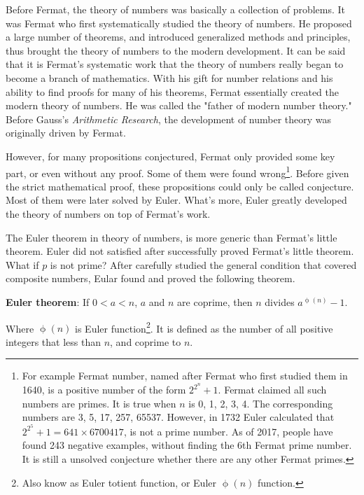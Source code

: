 \documentclass{article}
\begin{document}
Before Fermat, the theory of numbers was basically a collection of problems. It was Fermat who first systematically studied the theory of numbers. He proposed a large number of theorems, and introduced generalized methods and principles, thus brought the theory of numbers to the modern development. It can be said that it is Fermat's systematic work that the theory of numbers really began to become a branch of mathematics. With his gift for number relations and his ability to find proofs for many of his theorems, Fermat essentially created the modern theory of numbers. He was called the "father of modern number theory." Before Gauss's {\em Arithmetic Research}, the development of number theory was originally driven by Fermat.

However, for many propositions conjectured, Fermat only provided some key part, or even without any proof. Some of them were found wrong\footnote{For example Fermat number, named after Fermat who first studied them in 1640, is a positive number of the form $2^{2^n}+1$. Fermat claimed all such numbers are primes. It is true when $n$ is 0, 1, 2, 3, 4. The corresponding numbers are 3, 5, 17, 257, 65537. However, in 1732 Euler calculated that $2^{2^5} + 1 = 641 \times 6700417$, is not a prime number. As of 2017, people have found 243 negative examples, without finding the 6th Fermat prime number. It is still a unsolved conjecture whether there are any other Fermat primes.}. Before given the strict mathematical proof, these propositions could only be called conjecture. Most of them were later solved by Euler. What's more, Euler greatly developed the theory of numbers on top of Fermat's work.

The Euler theorem in theory of numbers, is more generic than Fermat's little theorem. Euler did not satisfied after successfully proved Fermat's little theorem. What if $p$ is not prime? After carefully studied the general condition that covered composite numbers, Eular found and proved the following theorem.

 
\begin{theorem}
\textbf{Euler theorem}: If $0 < a < n$, $a$ and $n$ are coprime, then $n$ divides $a^{\upphi(n)} - 1$.
\end{theorem}

Where $\upphi(n)$ is Euler function\footnote{Also know as Euler totient function, or Euler $\upphi(n)$ function.}. It is defined as the number of all positive integers that less than $n$, and coprime to $n$.
\end{document}
